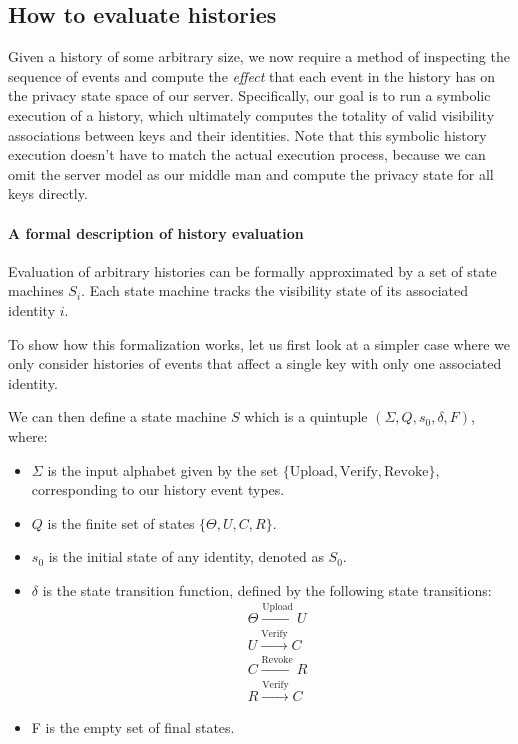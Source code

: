 \subsection{How to evaluate histories}
Given a history of some arbitrary size, we now require a method of inspecting the sequence of events and compute the \emph{effect} that each event in the history has on the privacy state space of our server. 
Specifically, our goal is to run a symbolic execution of a history, which ultimately computes the totality of valid visibility associations between keys and their identities. Note that this symbolic history execution doesn't have to match the actual execution process, because we can omit the server model as our middle man and compute the privacy state for all keys directly.

\paragraph{A formal description of history evaluation}
\label{sec:history_def}

Evaluation of arbitrary histories can be formally approximated by a set of state machines \(S_i\). Each state machine tracks the visibility state of its associated identity \(i\).

To show how this formalization works, let us first look at a simpler case where we only consider histories of events that affect a single key with only one associated identity. 

We can then define a state machine \(S\) which is a quintuple \((\Sigma,Q,s_0,\delta,F)\), where:
\begin{itemize}
    \item \(\Sigma\) is the input alphabet given by the set \(\{\text{Upload},\text{Verify},\text{Revoke}\}\), corresponding to our history event types.
    \item \(Q\) is the finite set of states \(\{\Theta,U,C,R\}\).
    \item \(s_0\) is the initial state of any identity, denoted as \(S_0\).
    \item \(\delta\) is the state transition function, defined by the following state transitions:
    \begin{equation}
        \begin{aligned}
            &\Theta \xrightarrow{\text{Upload}}U \\
            &U \xrightarrow{\text{Verify}}C \\
            &C \xrightarrow{\text{Revoke}}R \\
            &R \xrightarrow{\text{Verify}}C
        \end{aligned}
    \end{equation}
    \item F is the empty set of final states.
\end{itemize}

